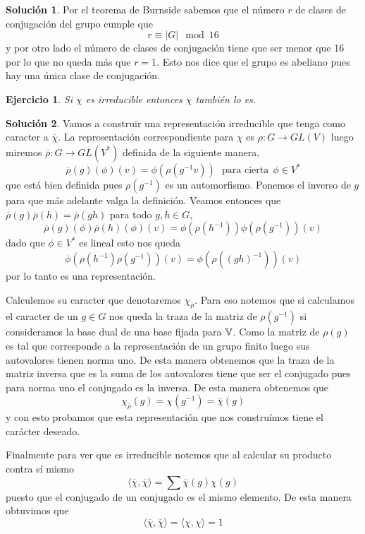 \documentclass[11pt]{article}
\theoremstyle{plain}
\newtheorem*{ej}{Ejercicio}
\theoremstyle{definition}
\newtheorem*{sol}{Solución}
\theoremstyle{remark}
\begin{document}
\begin{sol}
	Por el teorema de Burnside sabemos que el número $r$ de clases de conjugación del grupo cumple que 
	\[
	r \equiv |G|  \mod 16
	\]
	y por otro lado el número de clases de conjugación tiene que ser menor que 16 por lo que no queda más que $r=1$. Esto nos dice que el grupo es abeliano pues hay una única clase de conjugación.
\end{sol}

\newpage
\begin{tcolorbox}[colback=teal!25!white,colframe=teal!75!black]
	\begin{ej}
		Si $\chi$ es irreducible entonces $\overline \chi$ también lo es.
	\end{ej}	
\end{tcolorbox}
\medskip

\begin{sol}	
	Vamos a construir una representación irreducible que tenga como caracter a $\overline \chi$. La representación correspondiente para $\chi$ es $\rho: G \to GL(V)$ luego miremos $\overline{\rho}: G \to GL(V^{*})$ definida de la siguiente manera,
	\[
	\overline \rho (g) (\phi)(v) = \phi(\rho(g^{-1}v))  \ \ \ \text{para cierta} \ \ \phi \in V^*
	\]
	que está bien definida pues $\rho(g^{-1})$ es un automorfismo. Ponemos el inverso de $g$ para que más adelante valga la definición. Veamos entonces que $\overline\rho(g)\overline\rho(h) = \overline\rho (gh)$ para todo $g,h \in G$,
	\[
	\overline\rho(g)(\phi)	\overline\rho(h)(\phi)(v) = \phi(\rho(h^{-1}))\phi(\rho(g^{-1}))(v)
	\] 
	dado que $\phi \in V^*$ es lineal esto nos queda
	\[
	\phi(\rho(h^{-1})\rho(g^{-1}))(v) = \phi(\rho((gh)^{-1}))(v) 
	\]
	por lo tanto es una representación. 
	
	Calculemos su caracter que denotaremos $\chi_{\overline\rho}$. Para eso notemos que si calculamos el caracter de un $g \in G$ nos queda la traza de la matriz de $\rho(g^{-1})$ si consideramos la base dual de una base fijada para $\Bbb V$. Como la matriz de $\rho(g)$ es tal que corresponde a la representación de un grupo finito luego sus autovalores tienen norma uno. De esta manera obtenemos que la traza de la matriz inversa que es la suma de los autovalores tiene que ser el conjugado pues para norma uno el conjugado es la inversa. De esta manera obtenemos que 
	\begin{equation*}
		\chi_{\overline\rho}(g)=\chi(g^{-1}) = \overline \chi(g)
	\end{equation*}
	y con esto probamos que esta representación que nos construímos tiene el carácter deseado.
	
	Finalmente para ver que es irreducible notemos que al calcular su producto contra sí mismo
	\begin{equation*}
		\langle \overline\chi,\overline\chi \rangle = \sum \overline\chi(g) \chi(g)
	\end{equation*}
	puesto que el conjugado de un conjugado es el mismo elemento. De esta manera obtuvimos que $$\langle \overline\chi,\overline\chi \rangle = \langle \chi,\chi \rangle=1$$
\end{sol}
\end{document}
